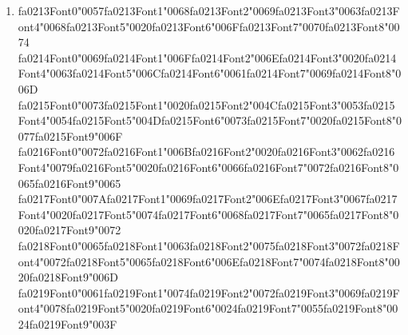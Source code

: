\documentclass[12pt]{article}
\begin{document}
\begin{enumerate}[label=Q\arabic*.]
 \item {\csname fa0213Font0\endcsname\char"0057}{\csname fa0213Font1\endcsname\char"0068}{\csname fa0213Font2\endcsname\char"0069}{\csname fa0213Font3\endcsname\char"0063}{\csname fa0213Font4\endcsname\char"0068}{\csname fa0213Font5\endcsname\char"0020}{\csname fa0213Font6\endcsname\char"006F}{\csname fa0213Font7\endcsname\char"0070}{\csname fa0213Font8\endcsname\char"0074} {\csname fa0214Font0\endcsname\char"0069}{\csname fa0214Font1\endcsname\char"006F}{\csname fa0214Font2\endcsname\char"006E}{\csname fa0214Font3\endcsname\char"0020}{\csname fa0214Font4\endcsname\char"0063}{\csname fa0214Font5\endcsname\char"006C}{\csname fa0214Font6\endcsname\char"0061}{\csname fa0214Font7\endcsname\char"0069}{\csname fa0214Font8\endcsname\char"006D} {\csname fa0215Font0\endcsname\char"0073}{\csname fa0215Font1\endcsname\char"0020}{\csname fa0215Font2\endcsname\char"004C}{\csname fa0215Font3\endcsname\char"0053}{\csname fa0215Font4\endcsname\char"0054}{\csname fa0215Font5\endcsname\char"004D}{\csname fa0215Font6\endcsname\char"0073}{\csname fa0215Font7\endcsname\char"0020}{\csname fa0215Font8\endcsname\char"0077}{\csname fa0215Font9\endcsname\char"006F} {\csname fa0216Font0\endcsname\char"0072}{\csname fa0216Font1\endcsname\char"006B}{\csname fa0216Font2\endcsname\char"0020}{\csname fa0216Font3\endcsname\char"0062}{\csname fa0216Font4\endcsname\char"0079}{\csname fa0216Font5\endcsname\char"0020}{\csname fa0216Font6\endcsname\char"0066}{\csname fa0216Font7\endcsname\char"0072}{\csname fa0216Font8\endcsname\char"0065}{\csname fa0216Font9\endcsname\char"0065} {\csname fa0217Font0\endcsname\char"007A}{\csname fa0217Font1\endcsname\char"0069}{\csname fa0217Font2\endcsname\char"006E}{\csname fa0217Font3\endcsname\char"0067}{\csname fa0217Font4\endcsname\char"0020}{\csname fa0217Font5\endcsname\char"0074}{\csname fa0217Font6\endcsname\char"0068}{\csname fa0217Font7\endcsname\char"0065}{\csname fa0217Font8\endcsname\char"0020}{\csname fa0217Font9\endcsname\char"0072} {\csname fa0218Font0\endcsname\char"0065}{\csname fa0218Font1\endcsname\char"0063}{\csname fa0218Font2\endcsname\char"0075}{\csname fa0218Font3\endcsname\char"0072}{\csname fa0218Font4\endcsname\char"0072}{\csname fa0218Font5\endcsname\char"0065}{\csname fa0218Font6\endcsname\char"006E}{\csname fa0218Font7\endcsname\char"0074}{\csname fa0218Font8\endcsname\char"0020}{\csname fa0218Font9\endcsname\char"006D} {\csname fa0219Font0\endcsname\char"0061}{\csname fa0219Font1\endcsname\char"0074}{\csname fa0219Font2\endcsname\char"0072}{\csname fa0219Font3\endcsname\char"0069}{\csname fa0219Font4\endcsname\char"0078}{\csname fa0219Font5\endcsname\char"0020}{\csname fa0219Font6\endcsname\char"0024}{\csname fa0219Font7\endcsname\char"0055}{\csname fa0219Font8\endcsname\char"0024}{\csname fa0219Font9\endcsname\char"003F}

\end{enumerate}
\end{document}
